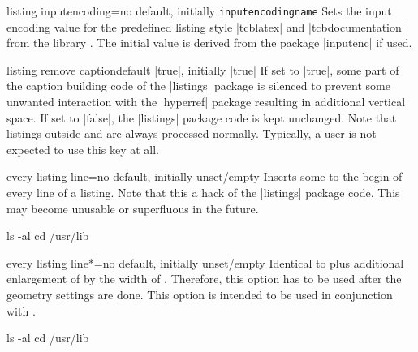 \clearpage
\begin{docTcbKey}{listing inputencoding}{=}{no default, initially \texttt{\cs inputencodingname}}
  Sets the input encoding value for the predefined listing style |tcblatex|
  and |tcbdocumentation| from the library .
  The initial value is derived from the package |inputenc| if used.
\end{docTcbKey}

\begin{docTcbKey}{listing remove caption}{}{default |true|, initially |true|}
If set to |true|, some part of the caption building code of the |listings| package
is silenced to prevent some unwanted interaction with the |hyperref| package resulting
in additional vertical space.
If set to |false|, the |listings| package code is kept unchanged.
Note that listings outside  and
 are always processed normally.
Typically, a user is not expected to use this key at all.
\end{docTcbKey}

\begin{docTcbKey}{every listing line}{=}{no default, initially unset/empty}
Inserts some  to the begin of every line of a listing.
Note that this a hack of the |listings| package code. This may become unusable
or superfluous in the future.
\begin{dispExample}

\begin{commandshell}
ls -al
cd /usr/lib
\end{commandshell}
\end{dispExample}
\end{docTcbKey}


\begin{docTcbKey}{every listing line*}{=}{no default, initially unset/empty}
Identical to  plus additional enlargement
of  by the width of . Therefore, this
option has to be used after the geometry settings are done.
This option is intended to be used in conjunction with .

\begin{dispExample}

\begin{commandshell}
ls -al
cd /usr/lib
\end{commandshell}
\end{dispExample}
\end{docTcbKey}


